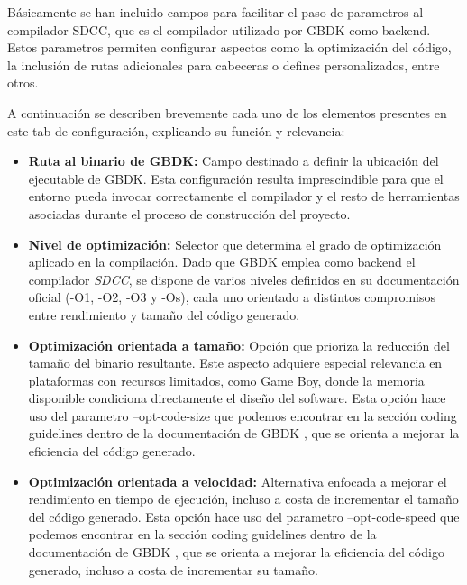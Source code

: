 \documentclass[../main.tex]{subfiles}
\begin{document}
Básicamente se han incluido campos para facilitar el paso de parametros al compilador SDCC, que es el compilador utilizado por GBDK como backend. Estos parametros permiten configurar aspectos como la optimización del código, la inclusión de rutas adicionales para cabeceras o defines personalizados, entre otros.
 

\clearpage 

A continuación se describen brevemente cada uno de los elementos presentes en este tab de configuración, explicando su función y relevancia:

\begin{itemize}
    \item \textbf{Ruta al binario de GBDK:} Campo destinado a definir la ubicación del ejecutable de GBDK. Esta configuración resulta imprescindible para que el entorno pueda invocar correctamente el compilador y el resto de herramientas asociadas durante el proceso de construcción del proyecto.

    \item \textbf{Nivel de optimización:} Selector que determina el grado de optimización aplicado en la compilación. Dado que GBDK emplea como backend el compilador \textit{SDCC}, se dispone de varios niveles definidos en su documentación oficial \cite{sdcc_manual} (-O1, -O2, -O3 y -Os), cada uno orientado a distintos compromisos entre rendimiento y tamaño del código generado.

    \item \textbf{Optimización orientada a tamaño:} Opción que prioriza la reducción del tamaño del binario resultante. Este aspecto adquiere especial relevancia en plataformas con recursos limitados, como Game Boy, donde la memoria disponible condiciona directamente el diseño del software. Esta opción hace uso del parametro --opt-code-size que podemos encontrar en la sección coding guidelines dentro de la documentación de GBDK \cite{gbdk_coding_guidelines}, que se orienta a mejorar la eficiencia del código generado.

    \item \textbf{Optimización orientada a velocidad:} Alternativa enfocada a mejorar el rendimiento en tiempo de ejecución, incluso a costa de incrementar el tamaño del código generado.  Esta opción hace uso del parametro --opt-code-speed que podemos encontrar en la sección coding guidelines dentro de la documentación de GBDK \cite{gbdk_coding_guidelines}, que se orienta a mejorar la eficiencia del código generado, incluso a costa de incrementar su tamaño.


\end{itemize}
\end{document}
